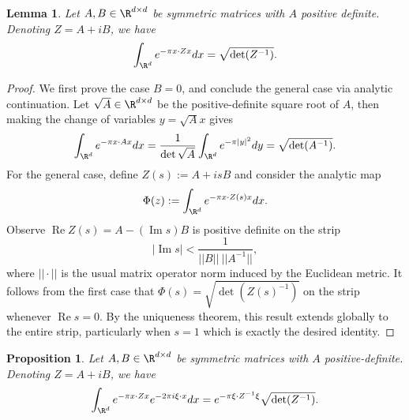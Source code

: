 \documentclass[reqno]{amsart}
\newtheorem{proposition}[theorem]{Proposition}
\newtheorem{lemma}[theorem]{Lemma}
\theoremstyle{definition}
\theoremstyle{remark}
\renewcommand{\Re}{\operatorname{Re}}
\renewcommand{\Im}{\operatorname{Im}}
\begin{document}
\begin{lemma}
	Let $A, B \in \R^{d \times d}$ be symmetric matrices with $A$ positive definite. Denoting $Z = A + iB$, we have
	\begin{align*}
		\int_{\R^d} e^{-\pi x\cdot Z x}dx = \sqrt{\det(Z^{-1})}.  
	\end{align*}
\end{lemma}

\begin{proof}
	We first prove the case $B = 0$, and conclude the general case via analytic continuation. Let $\sqrt A \in \R^{d \times d}$ be the positive-definite square root of $A$, then making the change of variables $y = \sqrt A x$ gives
		\[ \int_{\R^d} e^{-\pi x \cdot A x} dx = \frac{1}{\det \sqrt A} \int_{\R^d} e^{-\pi |y|^2} dy = \sqrt{\det (A^{-1}) }. \]
	For the general case, define $Z(s) := A + i s B$ and consider the analytic map
		\[ \Phi(z) := \int_{\R^d} e^{-\pi x \cdot Z(s) x} dx. \]
	Observe $\Re Z(s) = A - (\Im s) B$ is positive definite on the strip
	\[ |\Im s| < \frac{1}{||B|| \ || A^{-1}||}, \]
	where $|| \cdot ||$ is the usual matrix operator norm induced by the Euclidean metric. It follows from the first case that $\Phi(s) = \sqrt{\det( Z(s)^{-1})}$ on the strip whenever $\Re s = 0$. By the uniqueness theorem, this result extends globally to the entire strip, particularly when $s = 1$ which is exactly the desired identity. 
\end{proof}


\begin{proposition}
	Let $A, B \in \R^{d \times d}$ be symmetric matrices with $A$ positive-definite. Denoting $Z = A + iB$, we have
		\begin{equation*}
			\int_{\R^d} e^{-\pi x \cdot Z x} e^{-2\pi i \xi \cdot x} dx = e^{-\pi \xi \cdot Z^{-1} \xi}\sqrt{\det(Z^{-1})} .
		\end{equation*}	\label{prop:fouriergauss}
\end{proposition}
\end{document}
